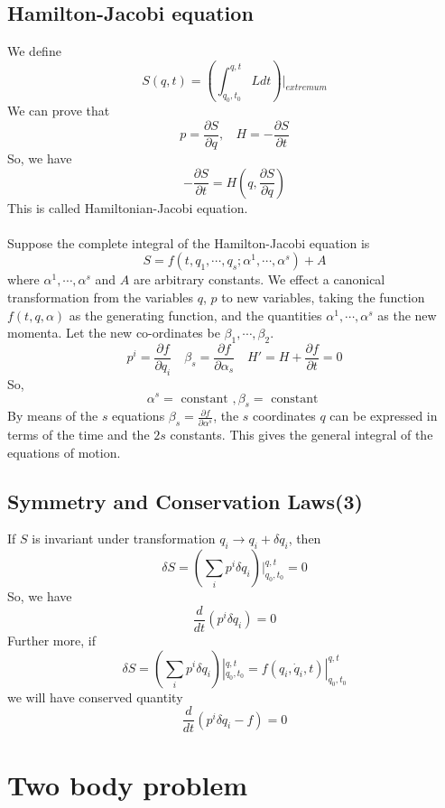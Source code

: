 \section{Hamilton-Jacobi equation}
We define
\[S(q,t)=\left(\int_{q_0,t_0}^{q,t} L dt\right)|_{extremum}\]
We can prove that
\[p = \frac{\partial S}{\partial q}, \ \ \ \ H = -\frac{\partial S}{\partial t}\]
So, we have
\[-\frac{\partial S}{\partial t} = H (q,\frac{\partial S}{\partial q})\]
This is called Hamiltonian-Jacobi equation.\\ \\
Suppose the complete integral of the Hamilton-Jacobi equation is
\[S=f(t,q_1,\cdots,q_s;\alpha^1,\cdots,\alpha^s)+A\]
where $\alpha^1,\cdots,\alpha^s$ and $A$ are arbitrary constants. We effect a canonical transformation from the
variables $q$, $p$ to new variables, taking the function $f(t,q,\alpha)$ as the generating function, and the quantities $\alpha^1,\cdots,\alpha^s$ as the new momenta.
Let the new co-ordinates be $\beta_1,\cdots,\beta_2$.
\[p^i = \frac{\partial f}{\partial q_i} \quad \beta_s = \frac{\partial f}{\partial \alpha_s} \quad H' = H + \frac{\partial f}{\partial t} =0\]
So,
\[\alpha^s = \mbox{ constant }, \beta_s = \mbox{ constant }\]
By means of the $s$ equations $\beta_s = \frac{\partial f}{\partial \alpha^s}$, the $s$ coordinates $q$ can be expressed in terms of the time and the $2s$ constants. This gives the general integral of the equations of motion.

\section{Symmetry and Conservation Laws(3)}
If $S$ is invariant under transformation
$q_i \rightarrow q_i + \delta q_i$, then 
\[\delta S = (\sum_i p^i \delta q_i) |_{q_0,t_0}^{q,t} = 0\]
So, we have
\[\frac{d}{dt} (p^i \delta q_i) = 0\]
Further more, if
\[\delta S = (\sum_i p^i \delta q_i) |_{q_0,t_0}^{q,t} =  f(q_i,\dot{q}_i,t)|_{q_0,t_0}^{q,t}\]
we will have conserved quantity
\[\frac{d}{dt} (p^i \delta q_i -f) = 0\]

\chapter{Two body problem}
